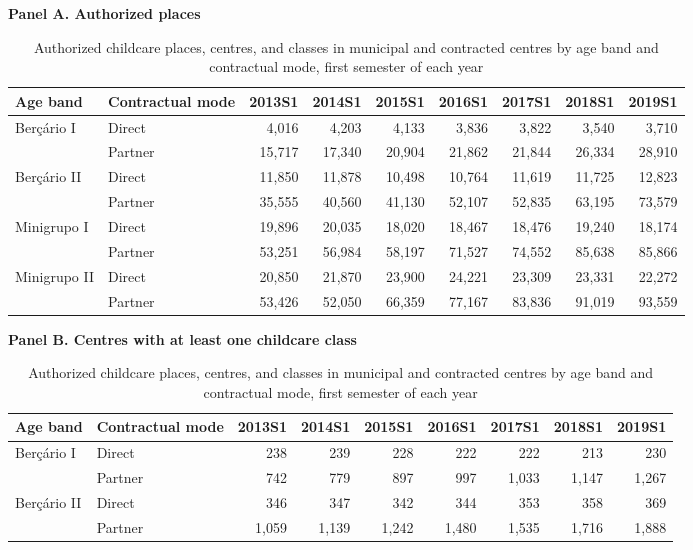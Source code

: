\begin{table}[htbp]\centering
\caption{Authorized childcare places, centres, and classes in municipal and contracted centres by age band and contractual mode, first semester of each year}
\label{tab:T2a_capacidade}
\label{tab:T2b_nescolas}
\label{tab:T2c_nturmas}
\footnotesize
\par\medskip\textbf{Panel A. Authorized places}\par\smallskip
\begin{tabular}{llrrrrrrr}
\toprule
Age band & Contractual mode & 2013S1 & 2014S1 & 2015S1 & 2016S1 & 2017S1 & 2018S1 & 2019S1 \\
\midrule
Ber\c{c}\'ario I & Direct & 4,016 & 4,203 & 4,133 & 3,836 & 3,822 & 3,540 & 3,710 \\
 & Partner & 15,717 & 17,340 & 20,904 & 21,862 & 21,844 & 26,334 & 28,910 \\
Ber\c{c}\'ario II & Direct & 11,850 & 11,878 & 10,498 & 10,764 & 11,619 & 11,725 & 12,823 \\
 & Partner & 35,555 & 40,560 & 41,130 & 52,107 & 52,835 & 63,195 & 73,579 \\
Minigrupo I & Direct & 19,896 & 20,035 & 18,020 & 18,467 & 18,476 & 19,240 & 18,174 \\
 & Partner & 53,251 & 56,984 & 58,197 & 71,527 & 74,552 & 85,638 & 85,866 \\
Minigrupo II & Direct & 20,850 & 21,870 & 23,900 & 24,221 & 23,309 & 23,331 & 22,272 \\
 & Partner & 53,426 & 52,050 & 66,359 & 77,167 & 83,836 & 91,019 & 93,559 \\
\end{tabular}
\par\medskip\textbf{Panel B. Centres with at least one childcare class}\par\smallskip
\begin{tabular}{llrrrrrrr}
Age band & Contractual mode & 2013S1 & 2014S1 & 2015S1 & 2016S1 & 2017S1 & 2018S1 & 2019S1 \\
\midrule
Ber\c{c}\'ario I & Direct & 238 & 239 & 228 & 222 & 222 & 213 & 230 \\
 & Partner & 742 & 779 & 897 & 997 & 1,033 & 1,147 & 1,267 \\
Ber\c{c}\'ario II & Direct & 346 & 347 & 342 & 344 & 353 & 358 & 369 \\
 & Partner & 1,059 & 1,139 & 1,242 & 1,480 & 1,535 & 1,716 & 1,888 \\

\end{tabular}
\end{table}
